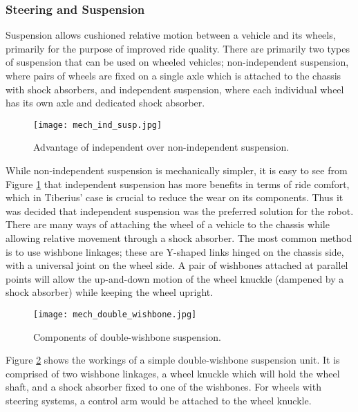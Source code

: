 \subsubsection{Steering and Suspension}
\label{sec:Mech_BGT_Steer}
Suspension allows cushioned relative motion between a vehicle and its wheels, primarily for the purpose of improved ride quality. There are primarily two types of suspension that can be used on wheeled vehicles; non-independent suspension, where pairs of wheels are fixed on a single axle which is attached to the chassis with shock absorbers, and independent suspension, where each individual wheel has its own axle and dedicated shock absorber.
\begin{figure}[!htb]
\begin{center}
\texttt{[image: mech\_ind\_susp.jpg]}
\end{center}
\caption{Advantage of independent over non-independent suspension.\cite{Dun_indsus}}
\label{fig:mech_indsus}
\end{figure}
\newline While non-independent suspension is mechanically simpler, it is easy to see from Figure \ref{fig:mech_indsus} that independent suspension has more benefits in terms of ride comfort, which in Tiberius' case is crucial to reduce the wear on its components. Thus it was decided that independent suspension was the preferred solution for the robot.
\newline
There are many ways of attaching the wheel of a vehicle to the chassis while allowing relative movement through a shock absorber. The most common method is to use wishbone linkages; these are Y-shaped links hinged on the chassis side, with a universal joint on the wheel side. A pair of wishbones attached at parallel points will allow the up-and-down motion of the wheel knuckle (dampened by a shock absorber) while keeping the wheel upright.
\begin{figure}[!htb]
\begin{center}
\texttt{[image: mech\_double\_wishbone.jpg]}
\end{center}
\caption{Components of double-wishbone suspension.\cite{Dun_dbwb}}
\label{fig:mech_dbwb}
\end{figure}
\newline
Figure \ref{fig:mech_dbwb} shows the workings of a simple double-wishbone suspension unit. It is comprised of two wishbone linkages, a wheel knuckle which will hold the wheel shaft, and a shock absorber fixed to one of the wishbones. For wheels with steering systems, a control arm would be attached to the wheel knuckle.